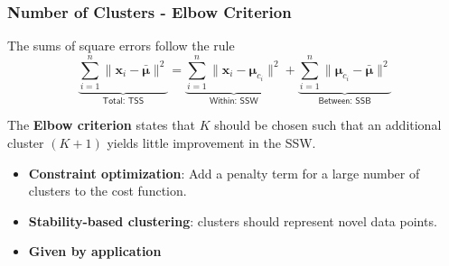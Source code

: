 \subsubsection{Number of Clusters - Elbow Criterion}
The sums of square errors follow the rule
\noindent\begin{equation*}
    \underbrace{\sum_{i=1}^{n}\|\mathbf{x}_i-\bar{\boldsymbol{\mu}}\|^2}_{\textsf{Total: TSS}} = \underbrace{\sum_{i=1}^{n}\|\mathbf{x}_i-\boldsymbol{\mu}_{c_i}\|^2}_{\textsf{Within: SSW}} + \underbrace{\sum_{i=1}^{n}\|\boldsymbol{\mu}_{c_i}-\bar{\boldsymbol{\mu}}\|^2}_{\textsf{Between: SSB}}
\end{equation*}

The \textbf{Elbow criterion} states that $K$ should be chosen such that an additional cluster $(K+1)$ yields little improvement in the SSW.

\begin{itemize}
    \item \textbf{Constraint optimization}: Add a penalty term for a large number of clusters to the cost function.
    \item \textbf{Stability-based clustering}: clusters should represent novel data points.
    \item \textbf{Given by application}
\end{itemize}
